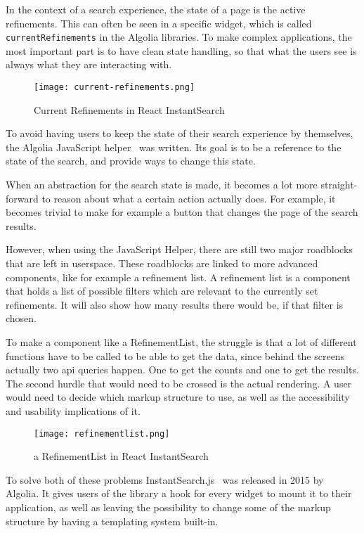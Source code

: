 In the context of a search experience, the state of a page is the active refinements. This can often be seen in a specific widget, which is called {\tt currentRefinements} in the Algolia libraries. To make complex applications, the most important part is to have clean state handling, so that what the users see is always what they are interacting with.

\begin{figure}[H]
  \centering
  \texttt{[image: current-refinements.png]}
  \caption{Current Refinements in React InstantSearch\cite{ris-storybooks}}
  \label{figure:current-refinements}
\end{figure}

To avoid having users to keep the state of their search experience by themselves, the Algolia JavaScript helper~\cite{algolia-js-helper} was written. Its goal is to be a reference to the state of the search, and provide ways to change this state.

When an abstraction for the search state is made, it becomes a lot more straight-forward to reason about what a certain action actually does. For example, it becomes trivial to make for example a button that changes the page of the search results.

However, when using the JavaScript Helper, there are still two major roadblocks that are left in \gls{userspace}. These roadblocks are linked to more advanced components, like for example a refinement list. A refinement list is a component that holds a list of possible filters which are relevant to the currently set refinements. It will also show how many results there would be, if that filter is chosen.

To make a component like a RefinementList, the struggle is that a lot of different functions have to be called to be able to get the data, since behind the screens actually two \acrshort{api} queries happen. One to get the counts and one to get the results. The second hurdle that would need to be crossed is the actual rendering. A user would need to decide which markup structure to use, as well as the accessibility and usability implications of it.

\begin{figure}[H]
  \centering
  \texttt{[image: refinementlist.png]}
  \caption{a RefinementList in React InstantSearch\cite{ris-storybooks}}
  \label{figure:refinementlist-ris}
\end{figure}

To solve both of these problems InstantSearch.js~\cite{instantsearch-js} was released in 2015 by Algolia. It gives users of the \gls{library} a hook for every widget to mount it to their application, as well as leaving the possibility to change some of the markup structure by having a templating system built-in.

